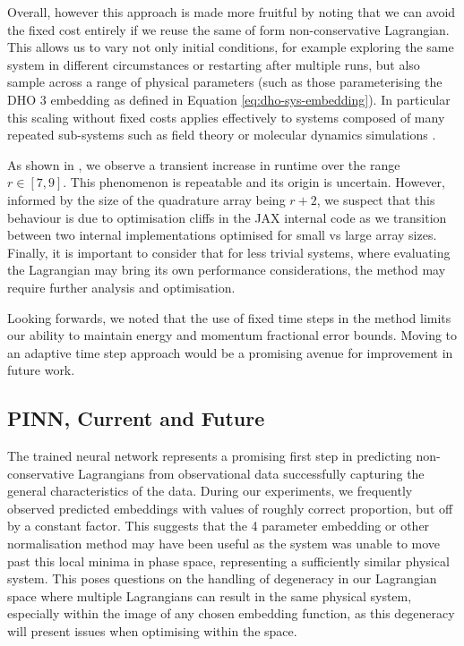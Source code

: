 Overall, however this approach is made more fruitful by noting that we can avoid the fixed cost entirely if we reuse the same of form non-conservative Lagrangian. This allows us to vary not only initial conditions, for example exploring the same system in different circumstances or restarting after multiple runs, but also sample across a range of physical parameters (such as those parameterising the DHO 3 embedding as defined in Equation \eqref{eq:dho-sys-embedding}). In particular this scaling without fixed costs applies effectively to systems composed of many repeated sub-systems such as field theory or molecular dynamics simulations \cite{tuckermanUnderstandingModernMolecular2000b}.

As shown in , we observe a transient increase in runtime over the range $r \in [7, 9]$. This phenomenon is repeatable and its origin is uncertain. However, informed by the size of the quadrature array being $r + 2$, we suspect that this behaviour is due to optimisation cliffs in the JAX internal code as we transition between two internal implementations optimised for small vs large array sizes. Finally, it is important to consider that for less trivial systems, where evaluating the Lagrangian may bring its own performance considerations, the method may require further analysis and optimisation.

Looking forwards, we noted that the use of fixed time steps in the method limits our ability to maintain energy and momentum fractional error bounds. Moving to an adaptive time step approach would be a promising avenue for improvement in future work.

\subsection{PINN, Current and Future}

The trained neural network represents a promising first step in predicting non-conservative Lagrangians from observational data successfully capturing the general characteristics of the data.
During our experiments, we frequently observed predicted embeddings with values of roughly correct proportion, but off by a constant factor. This suggests that the 4 parameter embedding or other normalisation method may have been useful as the system was unable to move past this local minima in phase space, representing a sufficiently similar physical system.
This poses questions on the handling of degeneracy in our Lagrangian space where multiple Lagrangians can result in the same physical system, especially within the image of any chosen embedding function, as this degeneracy will present issues when optimising within the space.

